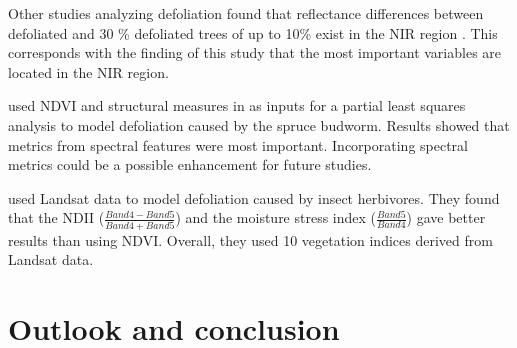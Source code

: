 \documentclass[review]{elsarticle}
\begin{document}
\noindent Other studies analyzing defoliation found that reflectance differences between defoliated and 30 \% defoliated trees of up to 10\% exist in the \ac{NIR} region \citep{rengarajan2016}.
This corresponds with the finding of this study that the most important variables are located in the NIR region.

\cite{goodbody2018} used NDVI and structural measures in as inputs for a partial least squares analysis to model defoliation caused by the spruce budworm.
Results showed that metrics from spectral features were most important.
Incorporating spectral metrics could be a possible enhancement for future studies.

\cite{townsend2012} used Landsat data to model defoliation caused by insect herbivores.
They found that the \ac{NDII} ($\frac{Band 4 - Band 5}{Band 4 + Band 5}$) and the moisture stress index ($\frac{Band 5}{Band 4}$) gave better results than using NDVI.
Overall, they used 10 vegetation indices derived from Landsat data.





\section{Outlook and conclusion}
\end{document}
